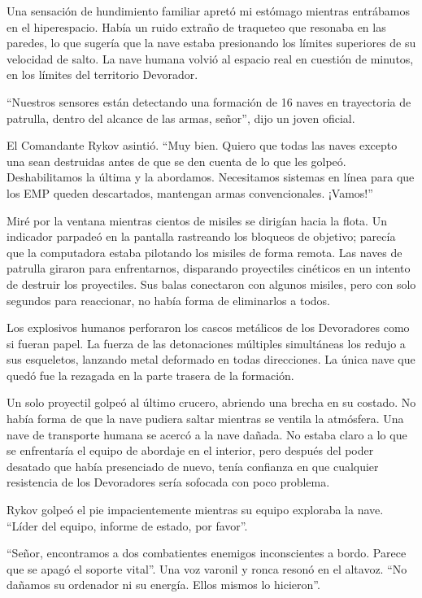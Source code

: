 \documentclass[spanish,12pt,a4paper,oneside,titlepage]{book}
\begin{document}
    Una sensación de hundimiento familiar apretó mi estómago mientras entrábamos en el hiperespacio. Había un ruido extraño de traqueteo que resonaba en las paredes, lo que sugería que la nave estaba presionando los límites superiores de su velocidad de salto. La nave humana volvió al espacio real en cuestión de minutos, en los límites del territorio Devorador.

    ``Nuestros sensores están detectando una formación de 16 naves en trayectoria de patrulla, dentro del alcance de las armas, señor'', dijo un joven oficial.

    El Comandante Rykov asintió. ``Muy bien. Quiero que todas las naves excepto una sean destruidas antes de que se den cuenta de lo que les golpeó. Deshabilitamos la última y la abordamos. Necesitamos sistemas en línea para que los EMP queden descartados, mantengan armas convencionales. ¡Vamos!''

    Miré por la ventana mientras cientos de misiles se dirigían hacia la flota. Un indicador parpadeó en la pantalla rastreando los bloqueos de objetivo; parecía que la computadora estaba pilotando los misiles de forma remota. Las naves de patrulla giraron para enfrentarnos, disparando proyectiles cinéticos en un intento de destruir los proyectiles. Sus balas conectaron con algunos misiles, pero con solo segundos para reaccionar, no había forma de eliminarlos a todos.

    Los explosivos humanos perforaron los cascos metálicos de los Devoradores como si fueran papel. La fuerza de las detonaciones múltiples simultáneas los redujo a sus esqueletos, lanzando metal deformado en todas direcciones. La única nave que quedó fue la rezagada en la parte trasera de la formación.

    Un solo proyectil golpeó al último crucero, abriendo una brecha en su costado. No había forma de que la nave pudiera saltar mientras se ventila la atmósfera. Una nave de transporte humana se acercó a la nave dañada. No estaba claro a lo que se enfrentaría el equipo de abordaje en el interior, pero después del poder desatado que había presenciado de nuevo, tenía confianza en que cualquier resistencia de los Devoradores sería sofocada con poco problema.

    Rykov golpeó el pie impacientemente mientras su equipo exploraba la nave. ``Líder del equipo, informe de estado, por favor''.

    ``Señor, encontramos a dos combatientes enemigos inconscientes a bordo. Parece que se apagó el soporte vital''. Una voz varonil y ronca resonó en el altavoz. ``No dañamos su ordenador ni su energía. Ellos mismos lo hicieron''.
\end{document}
